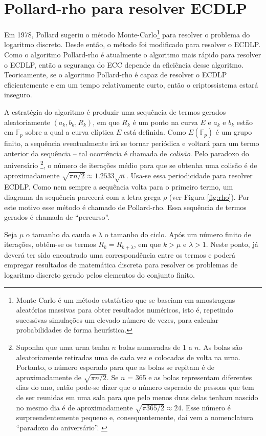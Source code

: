 \chapter{Pollard-rho para resolver ECDLP} \label{PR}
Em 1978, Pollard sugeriu o método Monte-Carlo\footnote{Monte-Carlo é um método estatístico que se baseiam em amostragens aleatórias massivas para obter resultados numéricos, isto é, repetindo sucessivas simulações um elevado número de vezes, para calcular probabilidades de forma heurística.} para resolver o problema do logaritmo discreto. Desde então, o método foi modificado para resolver o ECDLP. Como o algoritmo Pollard-rho é atualmente o algoritmo mais rápido para resolver o ECDLP, então a segurança do ECC depende da eficiência desse algoritmo. Teoricamente, se o algoritmo Pollard-rho é capaz de resolver o ECDLP eficientemente e em um tempo relativamente curto, então o criptossistema estará inseguro. \cite{Mandy:2007}

A estratégia do algoritmo é produzir uma sequência de termos gerados aleatoriamente $(a_k, b_k, R_k)$, em que \(R_k\) é um ponto na curva \(E\) e \(a_k\)  e \(b_k\) estão em $\mathbb{F}_p$ sobre a qual a curva elíptica \(E\) está definida. Como $E(\mathbb{F}_p)$ é um grupo finito, a sequência eventualmente irá se tornar periódica e voltará para um termo anterior da sequência \--- tal ocorrência é chamada de \textit{colisão}. Pelo paradoxo do aniversário
\footnote{Suponha que uma urna tenha \(n\) bolas numeradas de 1 a \(n\). As bolas são aleatoriamente retiradas uma de cada vez e colocadas de volta na urna. Portanto, o número esperado para que as bolas se repitam é de aproximadamente de $\sqrt{\pi n/2}$. Se \(n\) = 365 e as bolas representam diferentes dias do ano, então pode-se dizer que o número esperado de pessoas que tem de ser reunidas em uma sala para que pelo menos duas delas tenham nascido no mesmo dia é de aproximadamente $\sqrt{\pi 365/2} \approx 24$. Esse número é surpreendentemente pequeno e, consequentemente, daí vem a nomenclatura ``paradoxo do aniversário''. \cite{Guide}},
o número de iterações médio para que se obtenha uma colisão é de aproximadamente $\sqrt{\pi n/2} \approx 1.2533 \sqrt{n}$. Usa-se essa periodicidade para resolver ECDLP. Como nem sempre a sequência volta para o primeiro termo, um diagrama da sequência parecerá com a letra grega \(\rho\) (ver Figura \ref{fig:rho}). Por este motivo esse método é chamado de Pollard-rho. Essa sequência de termos gerados é chamada de ``percurso''. \cite{Guide}

Seja \(\mu\) o tamanho da cauda e \(\lambda\) o tamanho do ciclo. Após um número finito de iterações, obtêm-se os termos $R_k = R_{k+\lambda}$, em que $k > \mu$ e $\lambda > 1$. Neste ponto, já deverá ter sido encontrado uma correspondência entre os termos e poderá empregar resultados de matemática discreta para resolver os problemas de logaritmo discreto gerado pelos elementos do conjunto finito.

